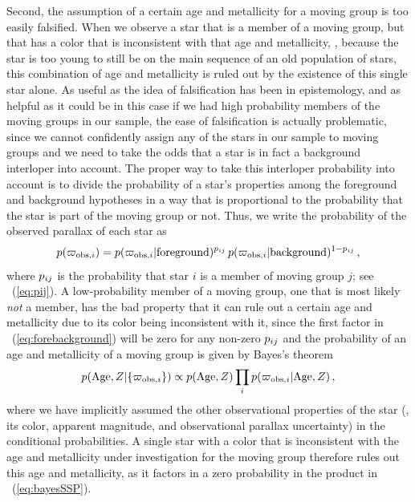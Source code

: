 Second, the assumption of a certain age and metallicity for a moving
group is too easily falsified. When we observe a star that is a member
of a moving group, but that has a color that is inconsistent with that
age and metallicity, \eg, because the star is too young to still be on
the main sequence of an old population of stars, this combination of
age and metallicity is ruled out by the existence of this single star
alone. As useful as the idea of falsification has been in
epistemology, and as helpful as it could be in this case if we had
high probability members of the moving groups in our sample, the ease
of falsification is actually problematic, since we cannot confidently
assign any of the stars in our sample to moving groups and we need to
take the odds that a star is in fact a background interloper into
account. The proper way to take this interloper probability into
account is to divide the probability of a star's properties among the
foreground and background hypotheses in a way that is proportional to
the probability that the star is part of the moving group or
not. Thus, we write the probability of the observed parallax of each
star as
\begin{equation}\label{eq:forebackground}
p(\varpi_{\mathrm{obs},i}) = p(\varpi_{\mathrm{obs},i} |
\mathrm{foreground})^{p_{ij}} \,p(\varpi_{\mathrm{obs},i} |
\mathrm{background})^{1-p_{ij}}\,,
\end{equation}
where $p_{ij}$ is the probability that star $i$ is a member of moving
group $j$; see \eqnname~(\ref{eq:pij}). A low-probability member of a
moving group, one that is most likely \emph{not} a member, has the bad
property that it can rule out a certain age and metallicity due to its
color being inconsistent with it, since the first factor in
\eqnname~(\ref{eq:forebackground}) will be zero for any non-zero
$p_{ij}$ and the probability of an age and metallicity of a moving group
is given by Bayes's theorem
\begin{equation}\label{eq:bayesSSP}
p(\mathrm{Age},Z | \{\varpi_{\mathrm{obs},i}\} ) \propto p(\mathrm{Age},Z) \prod_i p(\varpi_{\mathrm{obs},i} | \mathrm{Age},Z)\,,
\end{equation}
where we have implicitly assumed the other observational properties of
the star (\ie, its color, apparent magnitude, and observational
parallax uncertainty) in the conditional probabilities. A single star
with a color that is inconsistent with the age and metallicity under
investigation for the moving group therefore rules out this age and
metallicity, as it factors in a zero probability in the product in
\eqnname~(\ref{eq:bayesSSP}). 


